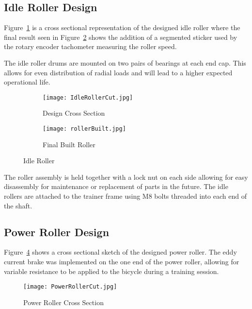 \subsection{Idle Roller Design}

Figure~\ref{fig:idlecut} is a cross sectional representation of the designed idle roller where the final result seen in Figure~\ref{fig:rollerBuild} shows the addition of a segmented sticker used by the rotary encoder tachometer measuring the roller speed.

The idle roller drums are mounted on two pairs of bearings at each end cap. This allows for even distribution of radial loads and will lead to a higher expected operational life. 

\begin{figure}[H]
	\centering
	\begin{subfigure}{.5\textwidth}
		\centering
		\texttt{[image: IdleRollerCut.jpg]}
		\caption{Design Cross Section}
		\label{fig:idlecut}
	\end{subfigure}%
	\begin{subfigure}{.5\textwidth}
		\centering
		\texttt{[image: rollerBuilt.jpg]}
		\caption{Final Built Roller}
		\label{fig:rollerBuild}
	\end{subfigure}
	\caption{Idle Roller}
	\label{fig:rollerdets}
\end{figure}

\vspace*{-0.9cm}

The roller assembly is held together with a lock nut on each side allowing for easy disassembly for maintenance or replacement of parts in the future. The idle rollers are attached to the trainer frame using M8 bolts threaded into each end of the shaft.

\subsection{Power Roller Design}

Figure~\ref{fig:rollerCAD} shows a cross sectional sketch of the designed power roller. The eddy current brake was implemented on the one end of the power roller, allowing for variable resistance to be applied to the bicycle during a training session.

\begin{figure}[H]
	\centering
	\texttt{[image: PowerRollerCut.jpg]}
	\caption{Power Roller Cross Section}
	\label{fig:rollerCAD}
\end{figure}

